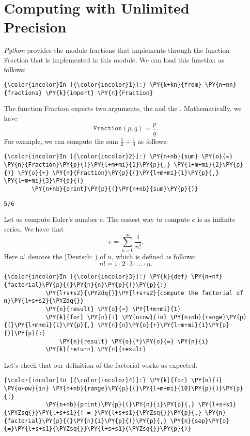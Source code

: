 \section{Computing with Unlimited Precision}
\textsl{Python} provides the module fractions that implements
 through the function Fraction that is
implemented in this module. We can load this function as follows:
\begin{Verbatim}[commandchars=\\\{\}]
{\color{incolor}In [{\color{incolor}1}]:} \PY{k+kn}{from} \PY{n+nn}{fractions} \PY{k}{import} \PY{n}{Fraction}
\end{Verbatim}
The function Fraction expects two arguments, the  and
the . Mathematically, we have
\[ \texttt{Fraction}(p, q) = \frac{p}{q}. \] For example, we can compute
the sum \(\frac{1}{2} + \frac{1}{3}\) as follows:
\begin{Verbatim}[commandchars=\\\{\}]
{\color{incolor}In [{\color{incolor}2}]:} \PY{n+nb}{sum} \PY{o}{=} \PY{n}{Fraction}\PY{p}{(}\PY{l+m+mi}{1}\PY{p}{,} \PY{l+m+mi}{2}\PY{p}{)} \PY{o}{+} \PY{n}{Fraction}\PY{p}{(}\PY{l+m+mi}{1}\PY{p}{,} \PY{l+m+mi}{3}\PY{p}{)}
        \PY{n+nb}{print}\PY{p}{(}\PY{n+nb}{sum}\PY{p}{)}
\end{Verbatim}


\begin{Verbatim}[commandchars=\\\{\}]
5/6
\end{Verbatim}
Let us compute Euler's number \(e\).  The easiest way to compute \(e\) is
as inifinite series. We have that
\[ e = \sum\limits_{n=0}^\infty \frac{1}{n!}. \]
Here \(n!\) denotes the
 (Deutsch: )  of \(n\), which is defined as follows:
\[ n! = 1 \cdot 2 \cdot 3 \cdot {\dots} \cdot n. \]
\begin{Verbatim}[commandchars=\\\{\}]
{\color{incolor}In [{\color{incolor}3}]:} \PY{k}{def} \PY{n+nf}{factorial}\PY{p}{(}\PY{n}{n}\PY{p}{)}\PY{p}{:}
            \PY{l+s+s2}{\PYZdq{}}\PY{l+s+s2}{compute the factorial of n}\PY{l+s+s2}{\PYZdq{}}
            \PY{n}{result} \PY{o}{=} \PY{l+m+mi}{1}
            \PY{k}{for} \PY{n}{i} \PY{o+ow}{in} \PY{n+nb}{range}\PY{p}{(}\PY{l+m+mi}{1}\PY{p}{,} \PY{n}{n}\PY{o}{+}\PY{l+m+mi}{1}\PY{p}{)}\PY{p}{:}
                \PY{n}{result} \PY{o}{*}\PY{o}{=} \PY{n}{i}
            \PY{k}{return} \PY{n}{result}
\end{Verbatim}
Let's check that our definition of the factorial works as expected.
\begin{Verbatim}[commandchars=\\\{\}]
{\color{incolor}In [{\color{incolor}4}]:} \PY{k}{for} \PY{n}{i} \PY{o+ow}{in} \PY{n+nb}{range}\PY{p}{(}\PY{l+m+mi}{10}\PY{p}{)}\PY{p}{:}
            \PY{n+nb}{print}\PY{p}{(}\PY{n}{i}\PY{p}{,} \PY{l+s+s1}{\PYZsq{}}\PY{l+s+s1}{! = }\PY{l+s+s1}{\PYZsq{}}\PY{p}{,} \PY{n}{factorial}\PY{p}{(}\PY{n}{i}\PY{p}{)}\PY{p}{,} \PY{n}{sep}\PY{o}{=}\PY{l+s+s1}{\PYZsq{}}\PY{l+s+s1}{\PYZsq{}}\PY{p}{)}
\end{Verbatim}

